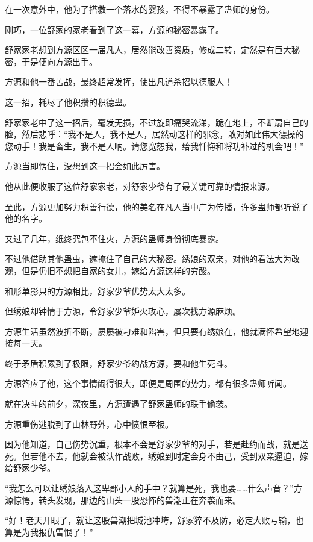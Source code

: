 \begin{this_body}
在一次意外中，他为了搭救一个落水的婴孩，不得不暴露了蛊师的身份。

刚巧，一位舒家的家老看到了这一幕，方源的秘密暴露了。

舒家家老想到方源区区一届凡人，居然能改善资质，修成二转，定然是有巨大秘密，于是便向方源出手。

方源和他一番苦战，最终超常发挥，使出凡道杀招以德服人！

这一招，耗尽了他积攒的积德蛊。

舒家家老中了这一招后，毫发无损，不过旋即痛哭流涕，跪在地上，不断扇自己的脸，然后悲呼：“我不是人，我不是人，居然动这样的邪念，敢对如此伟大德操的您动手！我是畜生，我不是人呐。请您宽恕我，给我忏悔和将功补过的机会吧！”

方源当即愣住，没想到这一招会如此厉害。

他从此便收服了这位舒家家老，对舒家少爷有了最关键可靠的情报来源。

至此，方源更加努力积善行德，他的美名在凡人当中广为传播，许多蛊师都听说了他的名字。

又过了几年，纸终究包不住火，方源的蛊师身份彻底暴露。

不过他借助其他蛊虫，遮掩住了自己的大秘密。绣娘的双亲，对他的看法大为改观，但是仍旧不想把自家的女儿，嫁给方源这样的穷酸。

和形单影只的方源相比，舒家少爷优势太大太多。

但绣娘却钟情于方源，令舒家少爷妒火攻心，屡次找方源麻烦。

方源生活虽然波折不断，屡屡被刁难和陷害，但只要有绣娘在，他就满怀希望地迎接每一天。

终于矛盾积累到了极限，舒家少爷约战方源，要和他生死斗。

方源答应了他，这个事情闹得很大，即便是周围的势力，都有很多蛊师听闻。

就在决斗的前夕，深夜里，方源遭遇了舒家蛊师的联手偷袭。

方源重伤逃脱到了山林野外，心中愤恨至极。

因为他知道，自己伤势沉重，根本不会是舒家少爷的对手，若是赴约而战，就是送死。但若他不去，他就会被认作战败，绣娘到时定会身不由己，受到双亲逼迫，嫁给舒家少爷。

“我怎么可以让绣娘落入这卑鄙小人的手中？就算是死，我也要……什么声音？”方源惊愕，转头发现，那边的山头一股恐怖的兽潮正在奔袭而来。

“好！老天开眼了，就让这股兽潮把城池冲垮，舒家猝不及防，必定大败亏输，也算是为我报仇雪恨了！”


\end{this_body}
